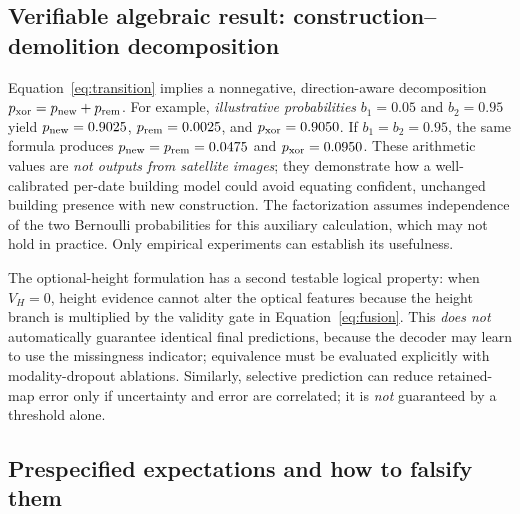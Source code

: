 \subsection{Verifiable algebraic result: construction--demolition decomposition}

Equation~\eqref{eq:transition} implies a nonnegative, direction-aware decomposition $p_{\rm xor}=p_{\rm new}+p_{\rm rem}$. For example, \emph{illustrative probabilities} $b_1=0.05$ and $b_2=0.95$ yield $p_{\rm new}=0.9025$, $p_{\rm rem}=0.0025$, and $p_{\rm xor}=0.9050$. If $b_1=b_2=0.95$, the same formula produces $p_{\rm new}=p_{\rm rem}=0.0475$ and $p_{\rm xor}=0.0950$. These arithmetic values are \emph{not outputs from satellite images}; they demonstrate how a well-calibrated per-date building model could avoid equating confident, unchanged building presence with new construction. The factorization assumes independence of the two Bernoulli probabilities for this auxiliary calculation, which may not hold in practice. Only empirical experiments can establish its usefulness.

The optional-height formulation has a second testable logical property: when $V_H=0$, height evidence cannot alter the optical features because the height branch is multiplied by the validity gate in Equation~\eqref{eq:fusion}. This \emph{does not} automatically guarantee identical final predictions, because the decoder may learn to use the missingness indicator; equivalence must be evaluated explicitly with modality-dropout ablations. Similarly, selective prediction can reduce retained-map error only if uncertainty and error are correlated; it is \emph{not} guaranteed by a threshold alone.

\subsection{Prespecified expectations and how to falsify them}

